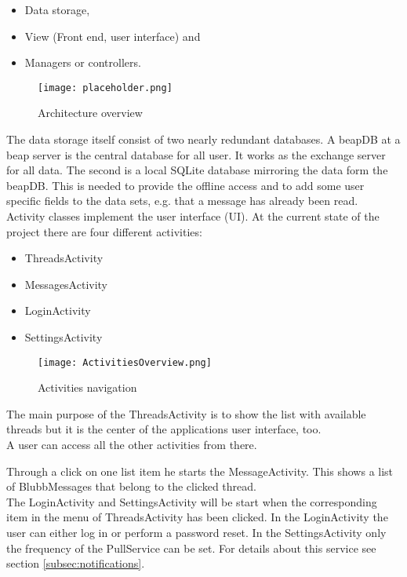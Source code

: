 \documentclass[12pt,a4paper,oneside]{report}
\newcommand{\beapDB}{beapDB}
\newcommand{\beapServer}{beap server}
\begin{document}
\begin{itemize}
\item{Data storage,}
\item{View (Front end, user interface) and}
\item{Managers or controllers.}
\end{itemize}

\begin{figure}[!ht]
    \texttt{[image: placeholder.png]}
	\caption{Architecture overview} 
	\label{fig:ArchOV}
\end{figure}

The data storage itself consist of two nearly redundant databases. A \beapDB{} at a \beapServer{} is the central database for all user. It works as the exchange server for all data. The second is a local SQLite database mirroring the data form the \beapDB{}. This is needed to provide the offline access and to add some user specific fields to the data sets, e.g. that a message has already been read.\\
Activity classes implement the user interface (UI). At the current state of the project there are four different activities:

\begin{itemize}
\item{ThreadsActivity}
\item{MessagesActivity}
\item{LoginActivity}
\item{SettingsActivity}
\end{itemize}

\begin{figure}[!ht]
	\centering
    \texttt{[image: ActivitiesOverview.png]}
	\caption{Activities navigation}
	\label{fig:ActivitiesNav}
\end{figure}

The main purpose of the ThreadsActivity is to show the list with available threads but it is the center of the applications user interface, too.\\ 
A user can access all the other activities from there. 


Through a click on one list item he starts the MessageActivity. This shows a list of BlubbMessages that belong to the clicked thread. \\
The LoginActivity and SettingsActivity will be start when the corresponding item in the menu of ThreadsActivity has been clicked. In the LoginActivity the user can either log in or perform a password reset.
In the SettingsActivity only the frequency of the PullService can be set. For details about this service see section \ref{subsec:notifications}.
\end{document}
